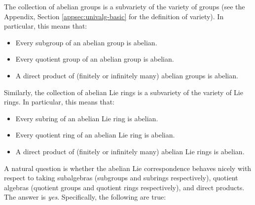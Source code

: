 \documentclass{ucetd}
\begin{document}
The collection of abelian groups is a subvariety of the variety of
groups (see the Appendix, Section \ref{appsec:univalg-basic} for the
definition of variety). In particular, this means that:

\begin{itemize}
\item Every subgroup of an abelian group is abelian.
\item Every quotient group of an abelian group is abelian.
\item A direct product of (finitely or infinitely many) abelian groups
  is abelian.
\end{itemize}

Similarly, the collection of abelian Lie rings is a subvariety of the
variety of Lie rings. In particular, this means that:

\begin{itemize}
\item Every subring of an abelian Lie ring is abelian.
\item Every quotient ring of an abelian Lie ring is abelian.
\item A direct product of (finitely or infinitely many) abelian Lie
  rings is abelian.
\end{itemize}

A natural question is whether the abelian Lie correspondence behaves
nicely with respect to taking subalgebras (subgroups and subrings
respectively), quotient algebras (quotient groups and quotient rings
respectively), and direct products. The answer is {\em
  yes}. Specifically, the following are true:
\end{document}
